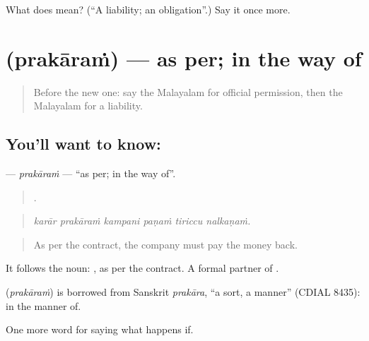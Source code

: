 \begin{tcolorbox}[breakable,colback=teal!4,colframe=teal!35!black,title={Before you move on}]
What does  mean? (\textquotedblleft{}A liability; an obligation\textquotedblright{}.) Say it once more.
\end{tcolorbox}
\section[\texorpdfstring{\ml{പ്രകാരം} (prakāraṁ)}{പ്രകാരം (prakāraṁ)}]{ (prakāraṁ) — as per; in the way of}

\label{lesson:ML-C444-prakaram}



\begin{quote}
Before the new one: say the Malayalam for official permission, then the Malayalam for a liability.
\end{quote}

\subsection*{You'll want to know: }
\textbf{} — \emph{prakāraṁ} — \textquotedblleft{}as per; in the way of\textquotedblright{}.

\begin{quote}
     .
\end{quote}

\begin{quote}
\emph{karār prakāraṁ kampani paṇaṁ tiriccu nalkaṇaṁ.}
\end{quote}

\begin{quote}
As per the contract, the company must pay the money back.
\end{quote}

It follows the noun:  , as per the contract. A formal partner of .

\begin{cousinweb}
\textbf{} (\emph{prakāraṁ}) is borrowed from Sanskrit \emph{prakāra}, \textquotedblleft{}a sort, a manner\textquotedblright{} (CDIAL 8435): in the manner of.
\end{cousinweb}

\begin{grammarlens}[title={What you've built}]
One more word for saying what happens if.
\end{grammarlens}


